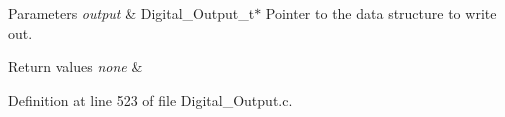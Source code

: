 \begin{DoxyParams}{Parameters}
{\em output} & Digital\-\_\-\-Output\-\_\-t$\ast$ Pointer to the data structure to write out. \\
\hline
\end{DoxyParams}

\begin{DoxyRetVals}{Return values}
{\em none} & \\
\hline
\end{DoxyRetVals}


Definition at line 523 of file Digital\-\_\-\-Output.\-c.

